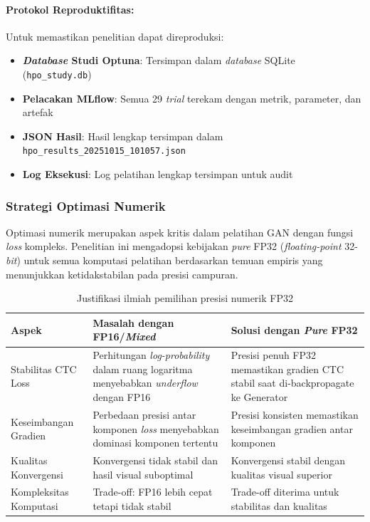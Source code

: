 \documentclass[12pt,a4paper]{article}
\begin{document}
\paragraph{Protokol Reproduktifitas:}

Untuk memastikan penelitian dapat direproduksi:

\begin{itemize}[leftmargin=*, nosep]
\item \textbf{\textit{Database} Studi Optuna}: Tersimpan dalam \textit{database} SQLite (\texttt{hpo\_study.db})
\item \textbf{Pelacakan MLflow}: Semua 29 \textit{trial} terekam dengan metrik, parameter, dan artefak
\item \textbf{JSON Hasil}: Hasil lengkap tersimpan dalam \texttt{hpo\_results\_20251015\_101057.json}
\item \textbf{Log Eksekusi}: Log pelatihan lengkap tersimpan untuk audit
\end{itemize}

\subsubsection{Strategi Optimasi Numerik}
Optimasi numerik merupakan aspek kritis dalam pelatihan GAN dengan fungsi \textit{loss} kompleks. Penelitian ini mengadopsi kebijakan \textit{pure} FP32 (\textit{floating-point} 32-\textit{bit}) untuk semua komputasi pelatihan berdasarkan temuan empiris yang menunjukkan ketidakstabilan pada presisi campuran.

\begin{table}[H]
\centering
\caption{Justifikasi ilmiah pemilihan presisi numerik FP32}
\label{tab:precision-justification}
\small
\begin{tabular}{|p{3.5cm}|p{5cm}|p{5.5cm}|}
\hline
\textbf{Aspek} & \textbf{Masalah dengan FP16/\textit{Mixed}} & \textbf{Solusi dengan \textit{Pure} FP32} \\ \hline
Stabilitas CTC Loss & Perhitungan \textit{log-probability} dalam ruang logaritma menyebabkan \textit{underflow} dengan FP16 & Presisi penuh FP32 memastikan gradien CTC stabil saat di-backpropagate ke Generator \\ \hline
Keseimbangan Gradien & Perbedaan presisi antar komponen \textit{loss} menyebabkan dominasi komponen tertentu & Presisi konsisten memastikan keseimbangan gradien antar komponen \\ \hline
Kualitas Konvergensi & Konvergensi tidak stabil dan hasil visual suboptimal & Konvergensi stabil dengan kualitas visual superior \\ \hline
Kompleksitas Komputasi & Trade-off: FP16 lebih cepat tetapi tidak stabil & Trade-off diterima untuk stabilitas dan kualitas \\ \hline
\end{tabular}
\end{table}
\end{document}
